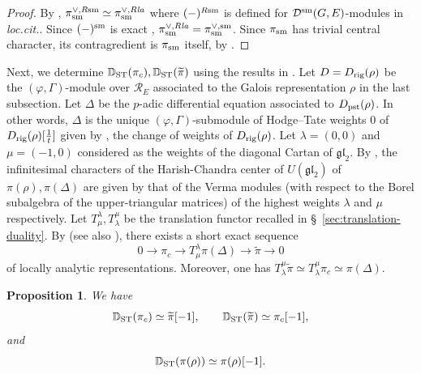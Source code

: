 \documentclass[a4paper,10pt]{amsart}
\theoremstyle{remark}
\theoremstyle{definition}
\theoremstyle{plain}
\newtheorem{proposition}[theorem]{Proposition}
\numberwithin{equation}{section}
\newcommand{\bbD}{{\mathbb D}}
\newcommand{\calD}{{\mathcal D}}
\newcommand{\calR}{{\mathcal R}}
\newcommand{\la}{{\it la}}
\newcommand{\sm}{{\rm sm}}
\newcommand{\ST}{{\rm ST}}
\begin{document}
\begin{proof}
	By \cite[Prop.~5.3.2]{JC23}, $\pi_{\sm}^{\vee,R\sm}\simeq \pi_{\sm}^{\vee,R\la}$ where $(-)^{R\sm}$ is defined for $\calD^{\sm}(G,E)$-modules in \textit{loc.cit.}. Since $(-)^{\sm}$ is exact \cite[Lem.~5.1.9]{JC23}, $\pi_{\sm}^{\vee,R\la}=\pi_{\sm}^{\vee,\sm}$. Since $\pi_{\sm}$ has trivial central character, its contragredient is $\pi_{\sm}$ itself, by
	\cite[\S~33.4, Prop. (1) \& Exercise]{bushnellHenniart2006}.
\end{proof}
Next, we determine $\bbD_{\ST}(\pi_c),\bbD_{\ST}(\widetilde{\pi})$ using the results in \cite{ding2023change}. Let $D=D_{\rm rig}(\rho)$ be the $(\varphi,\Gamma)$-module over $\calR_E$ associated to the Galois representation $\rho$ in the last subsection. Let $\Delta$ be the $p$-adic differential equation associated to $D_{\rm pst}(\rho)$. In other words, $\Delta$ is the unique $(\varphi,\Gamma)$-submodule of Hodge--Tate weights $0$ of $D_{\rm rig}(\rho)[\frac{1}{t}]$ given by \cite[Prop.~2.11]{ding2023change}, the change of weights of $D_{\rm rig}(\rho)$. Let $\lambda=(0,0)$ and $\mu=(-1,0)$ considered as the weights of the diagonal Cartan of $\mathfrak{gl}_2$. By \cite{dospinescu2012actions}, the infinitesimal characters of the Harish-Chandra center of $U(\mathfrak{gl}_2)$ of $\pi(\rho),\pi(\Delta)$ are given by that of the Verma modules (with respect to the Borel subalgebra of the upper-triangular matrices) of the highest weights $\lambda$ and $\mu$ respectively. Let $T_{\mu}^{\lambda},T_{\lambda}^{\mu}$ be the translation functor recalled in \S~\ref{sec:translation-duality}. By \cite[Thm.~1.1(2)]{ding2023change} (see also \cite[Prop.~2.4.2]{su2025locally}), there exists a short exact sequence
\begin{equation}\label{equation:translation-sequence}
	0\rightarrow \pi_c\rightarrow T_{\mu}^{\lambda}\pi(\Delta)\rightarrow \widetilde{\pi}\rightarrow 0
\end{equation}
of locally analytic representations. Moreover, one has $T_{\lambda}^{\mu}\widetilde{\pi}\simeq T_{\lambda}^{\mu}\pi_c\simeq \pi(\Delta)$.
\begin{proposition}\label{proposition:STdualpic}
	We have
	\[
 	\bbD_{\ST}(\pi_c)\simeq\widetilde\pi[-1],
 	\qquad\bbD_{\ST}(\widetilde\pi)\simeq\pi_c[-1],
\]
and 
\[\bbD_{\ST}(\pi(\rho))\simeq \pi(\rho)[-1].\]
\end{proposition}
\end{document}
